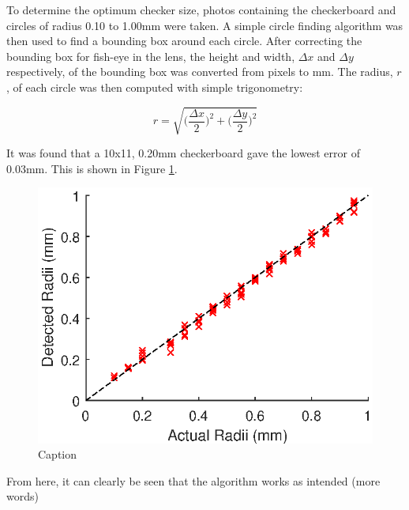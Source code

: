 \documentclass{physics_article_B}
\begin{document}
    To determine the optimum checker size, photos containing the checkerboard and circles of radius 0.10 to 1.00mm were taken. A simple circle finding algorithm was then used to find a bounding box around each circle. After correcting the bounding box for fish-eye in the lens, the height and width, $\Delta x$ and $\Delta y$ respectively, of the bounding box was converted from pixels to mm. The radius, $r$, of each circle was then computed with simple trigonometry:
    
    \begin{equation}\label{eq:radii}
        r = \sqrt{\Big(\frac{\Delta x}{2}\Big)^2 + \Big(\frac{\Delta y}{2}\Big)^2}
    \end{equation}
    
    \vspace{3pt} It was found that a 10x11, 0.20mm checkerboard gave the lowest error of 0.03mm. This is shown in Figure \ref{fig:calibsize}. 
    
    \begin{figure}[H]
        \centering
        \includegraphics{Figures/CameraCalib.eps}
        \caption{Caption}
        \label{fig:calibsize}
    \end{figure}
    
    From here, it can clearly be seen that the algorithm works as intended (more words)
    
\end{document}
